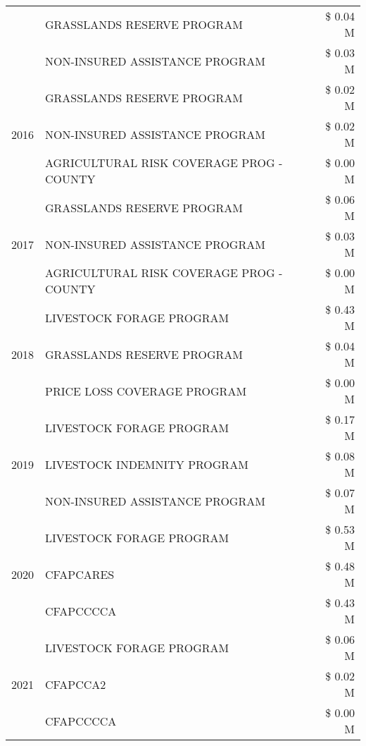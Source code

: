 \begin{tabular}{llr}
 & GRASSLANDS RESERVE PROGRAM & \$ 0.04 M \\
 & NON-INSURED ASSISTANCE PROGRAM & \$ 0.03 M \\
\cline{1-3}
\multirow[t]{3}{*}{2016} & GRASSLANDS RESERVE PROGRAM                    & \$ 0.02 M \\
 & NON-INSURED ASSISTANCE PROGRAM                & \$ 0.02 M \\
 & AGRICULTURAL RISK COVERAGE PROG - COUNTY      & \$ 0.00 M \\
\cline{1-3}
\multirow[t]{3}{*}{2017} & GRASSLANDS RESERVE PROGRAM & \$ 0.06 M \\
 & NON-INSURED ASSISTANCE PROGRAM & \$ 0.03 M \\
 & AGRICULTURAL RISK COVERAGE PROG - COUNTY & \$ 0.00 M \\
\cline{1-3}
\multirow[t]{3}{*}{2018} & LIVESTOCK FORAGE PROGRAM & \$ 0.43 M \\
 & GRASSLANDS RESERVE PROGRAM & \$ 0.04 M \\
 & PRICE LOSS COVERAGE PROGRAM & \$ 0.00 M \\
\cline{1-3}
\multirow[t]{3}{*}{2019} & LIVESTOCK FORAGE PROGRAM & \$ 0.17 M \\
 & LIVESTOCK INDEMNITY PROGRAM & \$ 0.08 M \\
 & NON-INSURED ASSISTANCE PROGRAM & \$ 0.07 M \\
\cline{1-3}
\multirow[t]{3}{*}{2020} & LIVESTOCK FORAGE PROGRAM & \$ 0.53 M \\
 & CFAPCARES & \$ 0.48 M \\
 & CFAPCCCCA & \$ 0.43 M \\
\cline{1-3}
\multirow[t]{3}{*}{2021} & LIVESTOCK FORAGE PROGRAM & \$ 0.06 M \\
 & CFAPCCA2 & \$ 0.02 M \\
 & CFAPCCCCA & \$ 0.00 M \\
\cline{1-3}
\bottomrule
\end{tabular}
